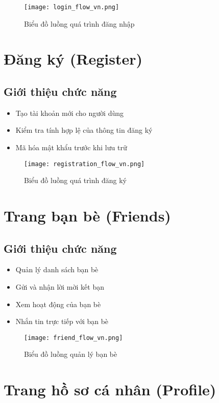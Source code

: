 \documentclass{book}
\let\oldsection\section
\renewcommand{\section}{\clearpage\oldsection}
\begin{document}
\begin{figure}[htbp]
    \centering
    \texttt{[image: login\_flow\_vn.png]}
    \caption{Biểu đồ luồng quá trình đăng nhập}
    \label{fig:login_flow}
\end{figure}

\section{Đăng ký (Register)}
\subsection{Giới thiệu chức năng}
\begin{itemize}
    \item Tạo tài khoản mới cho người dùng
    \item Kiểm tra tính hợp lệ của thông tin đăng ký
    \item Mã hóa mật khẩu trước khi lưu trữ
\end{itemize}

\begin{figure}[htbp]
    \centering
    \texttt{[image: registration\_flow\_vn.png]}
    \caption{Biểu đồ luồng quá trình đăng ký}
    \label{fig:register_flow}
\end{figure}

\section{Trang bạn bè (Friends)}
\subsection{Giới thiệu chức năng}
\begin{itemize}
    \item Quản lý danh sách bạn bè
    \item Gửi và nhận lời mời kết bạn
    \item Xem hoạt động của bạn bè
    \item Nhắn tin trực tiếp với bạn bè
\end{itemize}

\begin{figure}[htbp]
    \centering
    \texttt{[image: friend\_flow\_vn.png]}
    \caption{Biểu đồ luồng quản lý bạn bè}
    \label{fig:friend_flow}
\end{figure}

\section{Trang hồ sơ cá nhân (Profile)}
\end{document}
